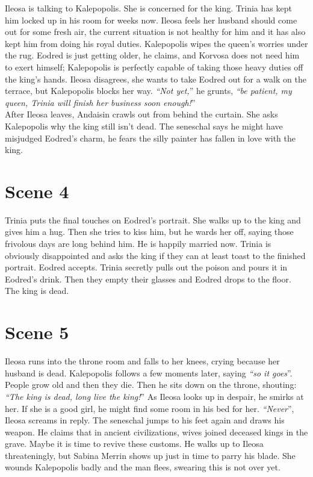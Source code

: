 Ileosa is talking to Kalepopolis. She is concerned for the king. Trinia has kept him locked up in his room for weeks now. Ileosa feels her husband should come out for some fresh air, the current situation is not healthy for him and it has also kept him from doing his royal duties. Kalepopolis wipes the queen's worries under the rug. Eodred is just getting older, he claims, and Korvosa does not need him to exert himself; Kalepopolis is perfectly capable of taking those heavy duties off the king's hands. Ileosa disagrees, she wants to take Eodred out for a walk on the terrace, but Kalepopolis blocks her way. {\itshape``Not yet,}'' he grunts, {\itshape``be patient, my queen, Trinia will finish her business soon enough!}''\\

After Ileosa leaves, Andaisin crawls out from behind the curtain. She asks Kalepopolis why the king still isn't dead. The seneschal says he might have misjudged Eodred's charm, he fears the silly painter has fallen in love with the king.\\

\section{Scene 4}

Trinia puts the final touches on Eodred's portrait. She walks up to the king and gives him a hug. Then she tries to kiss him, but he wards her off, saying those frivolous days are long behind him. He is happily married now. Trinia is obviously disappointed and asks the king if they can at least toast to the finished portrait. Eodred accepts. Trinia secretly pulls out the poison and pours it in Eodred's drink. Then they empty their glasses and Eodred drops to the floor. The king is dead.\\

\section{Scene 5}

Ileosa runs into the throne room and falls to her knees, crying because her husband is dead. Kalepopolis follows a few moments later, saying {\itshape``so it goes}''. People grow old and then they die. Then he sits down on the throne, shouting: {\itshape``The king is dead, long live the king!}'' As Ileosa looks up in despair, he smirks at her. If she is a good girl, he might find some room in his bed for her. {\itshape``Never}'', Ileosa screams in reply. The seneschal jumps to his feet again and draws his weapon. He claims that in ancient civilizations, wives joined deceased kings in the grave. Maybe it is time to revive these customs. He walks up to Ileosa threateningly, but Sabina Merrin shows up just in time to parry his blade. She wounds Kalepopolis badly and the man flees, swearing this is not over yet.\\

